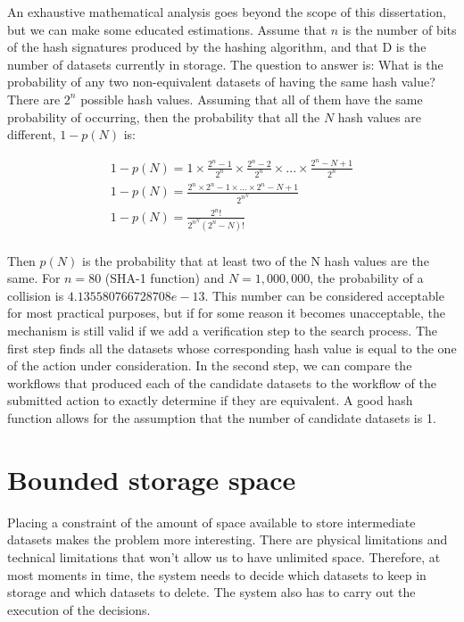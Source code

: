 An exhaustive mathematical analysis goes beyond the scope of this dissertation, but we can make some educated estimations.  Assume that $n$ is the number of bits of the hash signatures produced by the hashing algorithm, and that D is the number of datasets currently in storage.  The question to answer is: What is the probability of any two non-equivalent datasets of having the same hash value?  There are $2^n$ possible hash values.  Assuming that all of them have the same probability of occurring, then the probability that all the $N$ hash values are different, $1 - p(N)$ is:

\begin{multline}
	1 - p(N) = 1 \times \frac{2^n - 1}{2^n} \times \frac{2^n - 2}{2^n} \times . . . \times \frac{2^n - N + 1}{2^n} \\ 
	1 - p(N) = \frac{2^n \times 2^n - 1 \times . . . \times 2^n - N + 1}{2^{n^{N}}} \\ 
	1 - p(N) = \frac{2^n !}{2^{n{^N}} (2^n - N)!} \\
\end{multline}

Then $p(N)$ is the probability that at least two of the N hash values are the same.  For $n=80$ (SHA-1 function) and $N=1,000,000$, the probability of a collision is $4.135580766728708e-13$.  This number can be considered acceptable for most practical purposes, but if for some reason it becomes unacceptable, the mechanism is still valid if we add a verification step to the search process.  The first step finds all the datasets whose corresponding hash value is equal to the one of the action under consideration.  In the second step, we can compare the workflows that produced each of the candidate  datasets to the workflow of the submitted action to exactly determine if they are equivalent.  A good hash function allows for the assumption that the number of candidate datasets is 1.

\section{Bounded storage space}
Placing a constraint of the amount of space available to store intermediate datasets makes the problem more interesting. There are physical limitations and technical limitations that won't allow us to have unlimited space.  Therefore, at most moments in time, the system needs to decide which datasets to keep in storage and which datasets to delete. The system also has to carry out the execution of the decisions.


